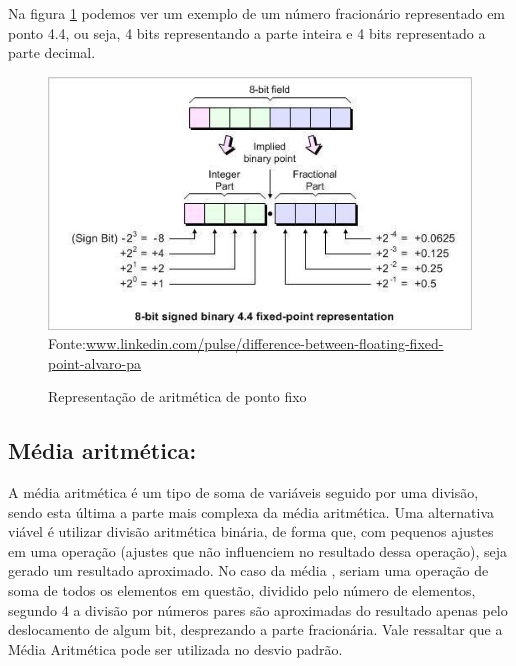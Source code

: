 Na figura \ref{fp} podemos ver um exemplo de um número fracionário representado em ponto 4.4, ou seja, 4 bits representando a parte inteira e 4 bits representado a parte decimal. 

\begin{figure}[H]
	\centering
	\caption{Representação de aritmética de ponto fixo}
	\includegraphics[width=12cm]{figures/fp.jpg}
	{Fonte:\url{www.linkedin.com/pulse/difference-between-floating-fixed-point-alvaro-pa}}
	
	\label{fp}
\end{figure}




\subsection{Média aritmética:}  A média aritmética é um tipo de soma de variáveis seguido por uma divisão, sendo esta  última a parte mais complexa da média aritmética. Uma alternativa viável é utilizar divisão aritmética binária, de forma que, com pequenos ajustes em uma operação (ajustes que não influenciem no resultado dessa operação), seja gerado um resultado aproximado. No caso da média , seriam uma operação de soma de todos os elementos em questão, dividido pelo número de elementos, segundo {4} a divisão por números pares são aproximadas do resultado apenas pelo deslocamento de algum bit, desprezando a parte fracionária. Vale ressaltar que a Média Aritmética pode ser utilizada no desvio padrão.

